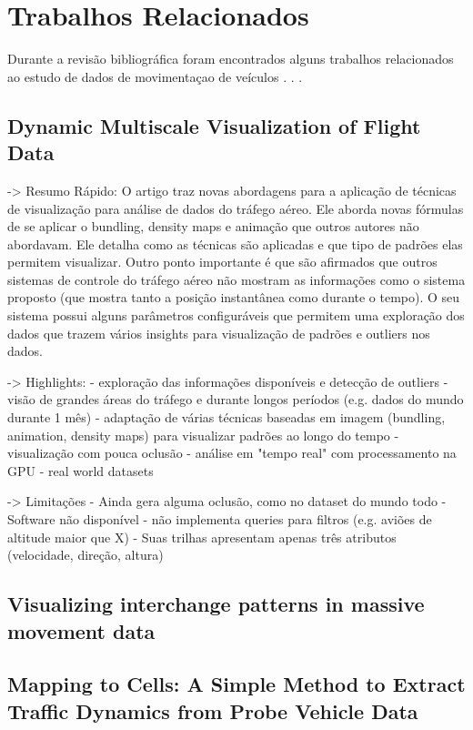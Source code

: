 \chapter{Trabalhos Relacionados}
\label{cap:trabalhos-relacionados}

Durante a revisão bibliográfica foram encontrados alguns trabalhos relacionados
ao estudo de dados de movimentaçao de veículos . . .

\section{Dynamic Multiscale Visualization of Flight Data}

-> Resumo Rápido: O artigo traz novas abordagens para a aplicação de técnicas de visualização
para análise de dados do tráfego aéreo. Ele aborda novas fórmulas de se aplicar o bundling,
density maps e animação que outros autores não abordavam. Ele detalha como as técnicas
são aplicadas e que tipo de padrões elas permitem visualizar. Outro ponto importante é
que são afirmados que outros sistemas de controle do tráfego aéreo não mostram as informações
como o sistema proposto (que mostra tanto a posição instantânea como durante o tempo). O seu sistema
possui alguns parâmetros configuráveis que permitem uma exploração dos dados que
trazem vários insights para visualização de padrões e outliers nos dados.

-> Highlights:
  - exploração das informações disponíveis e detecção de outliers
  - visão de grandes áreas do tráfego e durante longos períodos (e.g. dados do mundo durante 1 mês)
  - adaptação de várias técnicas baseadas em imagem (bundling, animation, density maps) para visualizar
  padrões ao longo do tempo
  - visualização com pouca oclusão
  - análise em "tempo real" com processamento na GPU
  - real world datasets

-> Limitações
  - Ainda gera alguma oclusão, como no dataset do mundo todo
  - Software não disponível
  - não implementa queries para filtros (e.g. aviões de altitude maior que X)
  - Suas trilhas apresentam apenas três atributos (velocidade, direção, altura)

\section{Visualizing interchange patterns in massive movement data}

\section{Mapping to Cells: A Simple Method to Extract Traffic Dynamics from Probe Vehicle Data}

